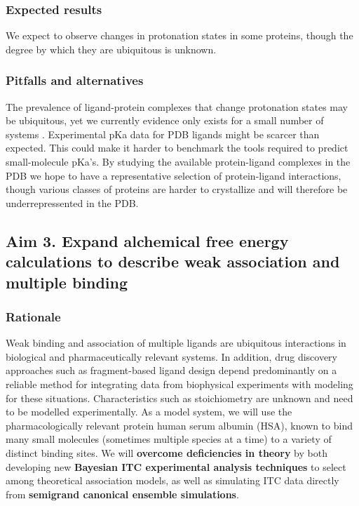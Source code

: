 \documentclass[10pt]{article}
\begin{document}
\subsubsection*{Expected results}
We expect to observe changes in protonation states in some proteins, though the degree by which they are ubiquitous is unknown.
\subsubsection*{Pitfalls and alternatives}
The prevalence of ligand-protein complexes that change protonation states may be ubiquitous, yet we currently evidence only exists for a small number of systems \cite{Aleksandrov2007a,Czodrowski2007a}.
Experimental pKa data for PDB ligands might be scarcer than expected. This could make it harder to benchmark the tools required to predict small-molecule pKa's.
By studying the available protein-ligand complexes in the PDB we hope to have a representative selection of protein-ligand interactions, though various classes of proteins are harder to crystallize and will therefore be underrepressented in the PDB.


\subsection*{Aim 3. Expand alchemical free energy calculations to describe weak association and multiple binding}
\subsubsection*{Rationale}
Weak binding and association of multiple ligands are ubiquitous interactions in biological and pharmaceutically relevant systems.
In addition, drug discovery approaches such as fragment-based ligand design depend predominantly on a reliable method for integrating data from biophysical experiments with modeling for these situations. Characteristics such as stoichiometry are unknown and need to be modelled experimentally.
As a model system, we will use the pharmacologically relevant protein human serum albumin (HSA), known to bind many small molecules (sometimes multiple species at a time) to a variety of distinct binding sites.
We will \textbf{overcome deficiencies in theory} by both developing new \textbf{Bayesian ITC experimental analysis techniques} to select among theoretical association models, as well as simulating ITC data directly from \textbf{semigrand canonical ensemble simulations}.
\end{document}
